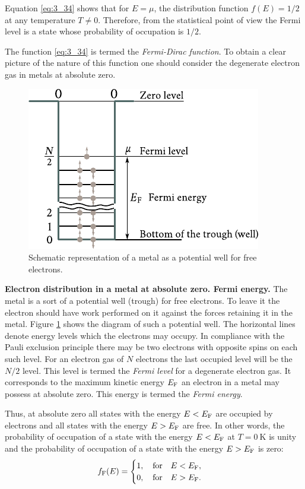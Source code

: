 Equation \eqref{eq:3_34} shows that for $E=\mu$, the distribution function $f(E)=1/2$ at any temperature $T\neq 0$. Therefore, from the statistical point of view the Fermi level is a state whose probability of
occupation is $1/2$.

The function \eqref{eq:3_34} is termed the \textit{Fermi-Dirac function}. To obtain a clear picture of the nature of this function one should consider the degenerate electron gas in metals at absolute zero.

\begin{figure}[t]
	\begin{center}
		\includegraphics[scale=1]{figures/ch_03/fig_3_4.pdf}
		\caption[]{Schematic representation of a metal as a potential well for free electrons.}
		\label{fig:3_4}
	\end{center}
	\vspace{-0.7cm}
\end{figure}

\textbf{Electron distribution in a metal at absolute zero. Fermi energy.} The metal is a sort of a potential well (trough) for free electrons. To leave it the electron should have work performed on it against the forces retaining it in the metal. Figure \ref{fig:3_4} shows the diagram of such a potential well. The horizontal lines denote energy levels which the electrons may occupy. In compliance with the Pauli exclusion principle there may be two electrons with opposite spins on each such level. For an electron gas of $N$ electrons the last occupied level will be the $N/2$ level. This level is termed the \textit{Fermi level} for a degenerate electron gas. It corresponds to the maximum kinetic energy $E_{\text{F}}$ an electron in a metal may possess at absolute zero. This energy is termed the \textit{Fermi energy}.

Thus, at absolute zero all states with the energy $E<E_{\text{F}}$ are occupied by electrons and all states with the energy $E>E_{\text{F}}$ are free. In other words, the probability of occupation of a state with the energy $E<E_{\text{F}}$ at $T=\SI{0}{\kelvin}$ is unity and the probability of occupation of a state with the energy $E>E_{\text{F}}$ is zero:
\begin{equation}\label{eq:3_35}
    f_{\text{F}}(E) = \begin{cases}
    1,\quad \text{for}\quad E<E_{\text{F}},\\
    0,\quad \text{for}\quad E>E_{\text{F}}.
    \end{cases}
\end{equation}

